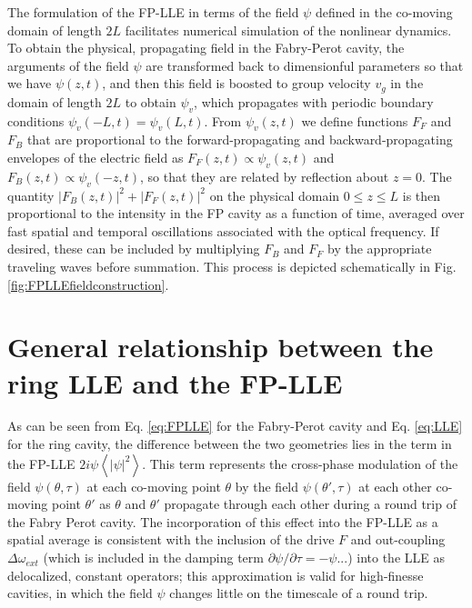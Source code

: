 The formulation of the FP-LLE in terms of the field $\psi$ defined in the co-moving domain of length $2L$ facilitates numerical simulation of the nonlinear dynamics. To obtain the physical, propagating field in the Fabry-Perot cavity, the arguments of the field $\psi$ are transformed back to dimensionful parameters so that we have $\psi(z,t)$, and then this field is boosted to group velocity $v_g$ in the domain of length $2L$ to obtain $\psi_v$, which propagates with periodic boundary conditions $\psi_v(-L,t)=\psi_v(L,t)$. From $\psi_v(z,t)$ we define functions $F_F$ and $F_B$ that are proportional to the forward-propagating and backward-propagating envelopes of the electric field as $F_F(z,t)\propto\psi_v(z,t)$ and $F_B(z,t)\propto\psi_v(-z,t)$, so that they are related by reflection about $z=0$. The quantity $|F_B(z,t)|^2+|F_F(z,t)|^2$ on the physical domain $0\leq z \leq L$ is then proportional to the intensity in the FP cavity as a function of time, averaged over fast spatial and temporal oscillations associated with the optical frequency. If desired, these can be included by multiplying $F_B$ and $F_F$ by the appropriate traveling waves before summation. This process is depicted schematically in Fig. \ref{fig:FPLLEfieldconstruction}.




\section{General relationship between the ring LLE and the FP-LLE}
As can be seen from Eq. \ref{eq:FPLLE} for the Fabry-Perot cavity and Eq. \ref{eq:LLE} for the ring cavity, the difference between the two geometries lies in the term in the FP-LLE $2i\psi\left<|\psi|^2\right>$. This term represents the cross-phase modulation of the field $\psi(\theta,\tau)$ at each co-moving point $\theta$ by the field $\psi(\theta',\tau)$ at each other co-moving point $\theta'$ as $\theta$ and $\theta'$ propagate through each other during a round trip of the Fabry Perot cavity. The incorporation of this effect into the FP-LLE as a spatial average is consistent with the inclusion of the drive $F$ and out-coupling $\Delta\omega_{ext}$ (which is included in the damping term $\partial\psi/\partial\tau=-\psi...$) into the LLE as delocalized, constant operators; this approximation is valid for high-finesse cavities, in which the field $\psi$ changes little on the timescale of a round trip.

